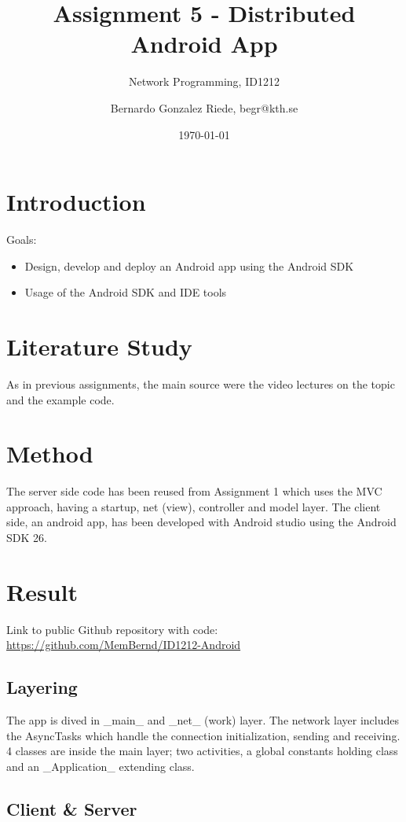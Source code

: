 \documentclass[a4paper]{scrartcl}
\title{Assignment 5 - Distributed Android App}
\subtitle{Network Programming, ID1212}
\author{Bernardo Gonzalez Riede, begr@kth.se}
\date{\today}
\begin{document}
\maketitle

\section{Introduction}
Goals:
\begin{itemize}
	\item Design, develop and deploy an Android app using the Android SDK
	\item Usage of the Android SDK and IDE tools
\end{itemize}


\section{Literature Study}
As in previous assignments, the main source were the video lectures on the topic and the example code.

\section{Method}
The server side code has been reused from Assignment 1 which uses the MVC approach, having a startup, net (view), controller and model layer.
The client side, an android app, has been developed with Android studio using the Android SDK 26.


\section{Result}

Link to public Github repository with code:
\href{https://github.com/MemBernd/ID1212-Android}{https://github.com/MemBernd/ID1212-Android}

\subsection{Layering}
The app is dived in _main_ and _net_ (work) layer.
The network layer includes the AsyncTasks which handle the connection initialization, sending and receiving.
4 classes are inside the main layer; two activities, a global constants holding class and an _Application_ extending class.


\subsection{Client \& Server}
\end{document}

